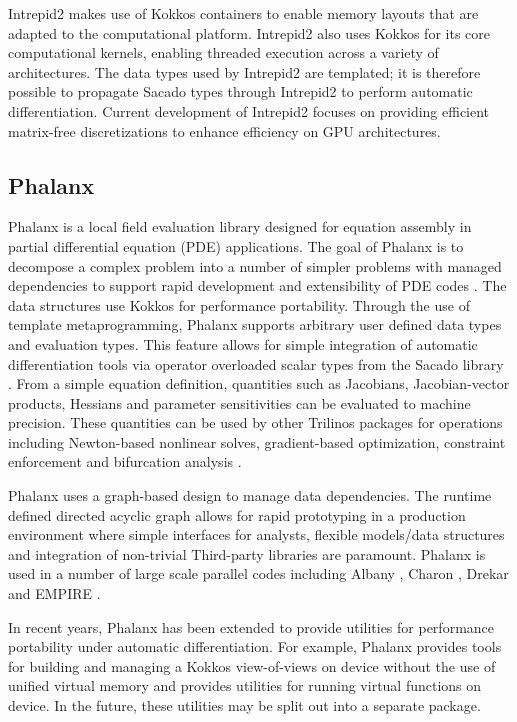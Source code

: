 Intrepid2 makes use of Kokkos containers to enable memory layouts that are adapted to the computational platform. Intrepid2 also uses Kokkos for its core computational kernels, enabling threaded execution across a variety of architectures. The data types used by Intrepid2 are templated; it is therefore possible to propagate Sacado types through Intrepid2 to perform automatic differentiation. Current development of Intrepid2 focuses on providing efficient matrix-free discretizations to enhance efficiency on GPU architectures. 

\subsection{Phalanx}
Phalanx is a local field evaluation library designed for equation assembly in partial differential equation (PDE) applications. The goal of Phalanx is to decompose a complex problem into a number of simpler problems with managed dependencies to support rapid development and extensibility of PDE codes \cite{Notz2012,pawlowski2012automating,pawlowski2012automatingpart2}. The data structures use Kokkos \cite{trott2021kokkos} for performance portability. Through the use of template metaprogramming, Phalanx supports arbitrary user defined data types and evaluation types. This feature allows for simple integration of automatic differentiation tools via operator overloaded scalar types from the Sacado library \cite{phipps2022automatic}. From a simple equation definition, quantities such as Jacobians, Jacobian-vector products, Hessians and parameter sensitivities can be evaluated to machine precision. These quantities can be used by other Trilinos packages for operations including Newton-based nonlinear solves, gradient-based optimization, constraint enforcement and bifurcation analysis \cite{pawlowski2012automating,pawlowski2012automatingpart2}.

Phalanx uses a graph-based design to manage data dependencies. The runtime defined directed acyclic graph allows for rapid prototyping in a production environment where simple interfaces for analysts, flexible models/data structures and integration of non-trivial Third-party libraries are paramount. Phalanx is used in a number of large scale parallel codes including Albany \cite{Salinger2016}, Charon \cite{CharonUsersManual2020}, Drekar \cite{Crockatt2022,Miller2019,Shadid2016mhd} and EMPIRE \cite{BettencourtBrownEtAl2021_EmpirePic}.

In recent years, Phalanx has been extended to provide utilities for performance portability under automatic differentiation. For example, Phalanx provides tools for building and managing a Kokkos view-of-views on device without the use of unified virtual memory and provides utilities for running virtual functions on device. In the future, these utilities may be split out into a separate package.

